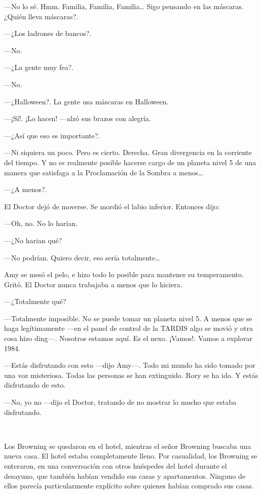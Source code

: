 ---No lo sé. Hmm. Familia, Familia, Familia\ldots{} Sigo pensando en las máscaras. ¿Quién lleva máscaras?.

---¿Los ladrones de bancos?.

---No.

---¿La gente muy fea?.

---No.

---¿Halloween?. La gente usa máscaras en Halloween.

---¡Sí!. ¡Lo hacen! ---alzó sus brazos con alegría.

---¿Así que eso es importante?.

---Ni siquiera un poco. Pero es cierto. Derecha. Gran divergencia en la corriente del tiempo. Y no es realmente posible hacerse cargo de un planeta nivel 5 de una manera que satisfaga a la Proclamación de la Sombra a menos\ldots{}

---¿A menos?.

El Doctor dejó de moverse. Se mordió el labio inferior. Entonces dijo:

---Oh, no. No lo harían.

---¿No harian qué?

---No podrían. Quiero decir, eso sería totalmente\ldots{}

Amy se mesó el pelo, e hizo todo lo posible para mantener su temperamento. Gritó. El Doctor nunca trabajaba a menos que lo hiciera.

---¿Totalmente qué?

---Totalmente imposible. No se puede tomar un planeta nivel 5. A menos que se haga legítimamente ---en el panel de control de la TARDIS algo se movió y otra cosa hizo ding---. Nosotros estamos aquí. Es el nexo. ¡Vamos!. Vamos a explorar 1984.

---Estás disfrutando con esto ---dijo Amy---. Todo mi mundo ha sido tomado por una voz misteriosa. Todas las personas se han extinguido. Rory se ha ido. Y estás disfrutando de esto.

---No, yo no ---dijo el Doctor, tratando de no mostrar lo mucho que estaba disfrutando.

~

Los Browning se quedaron en el hotel, mientras el señor Browning buscaba una nueva casa. El hotel estaba completamente lleno. Por casualidad, los Browning se enteraron, en una conversación con otros huéspedes del hotel durante el desayuno, que también habían vendido sus casas y apartamentos. Ninguno de ellos parecía particularmente explícito sobre quienes habían comprado sus casas.

